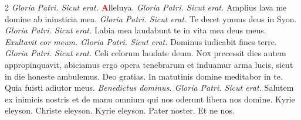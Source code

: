 \begin{multicols}{2}
\newline \textit{Gloria Patri. Sicut erat.} \textcolor{Red}{\bfseries A}lleluya.
\newline {}  \textit{Gloria Patri. Sicut erat.} 
\newline {} Amplius lava me domine ab iniusticia mea.
\newline {}  \textit{Gloria Patri. Sicut erat.} 
\newline {} Te decet ymnus deus in Syon.
\newline {}    \textit{Gloria Patri. Sicut erat.} 
\newline {} Labia mea laudabunt te in vita mea deus meus.
\newline {} \textit{Exultavit cor meum. Gloria Patri. Sicut erat.} 
\newline {} Dominus iudicabit fines terre.
\newline {}      \textit{Gloria Patri. Sicut erat.} 
\newline {} Celi celorum laudate deum.
\newline {}
\lettrine[lines=2]{\zallmancaps \color{Blue} N}{ox} precessit dies autem appropinquavit, abiciamus ergo opera tenebrarum et induamur arma lucis, sicut in die honeste ambulemus. \R Deo gratias.
\newline {}
\newline \V In matutinis domine meditabor in te. \R Quia fuisti adiutor meus.
\newline \textit{Benedictus dominus. Gloria Patri. Sicut erat.}
 Salutem ex inimicis nostris et de manu omnium qui nos oderunt libera nos domine.
\newline {} Kyrie eleyson. Christe eleyson. Kyrie eleyson. Pater noster. Et ne nos.

\end{multicols}
